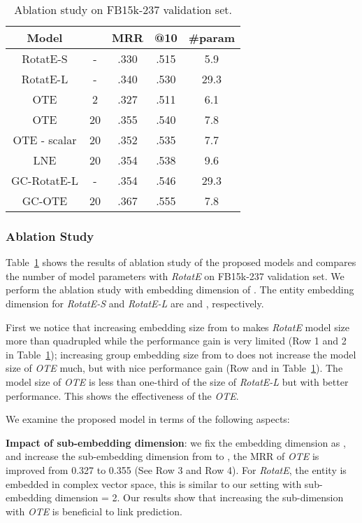 \documentclass[11pt,a4paper]{article}
\begin{document}
\begin{table}[!h]
    \small
    \centering
    \begin{tabular}{c|c|c|c|c}
        \hline
        Model &  & MRR & @10 & \#param\\
         \hline
         RotatE-S & - & .330 & .515 & 5.9 \\
         \hline
         RotatE-L & - & .340 & .530 & 29.3 \\
         \hline
         \hline
         OTE & 2 & .327 & .511 & 6.1 \\
         \hline
         OTE & 20 & .355 & .540 & 7.8 \\
         \hline
         \hline
         OTE - scalar & 20 & .352 & .535 & 7.7 \\
         \hline
         LNE & 20 & .354 & .538 & 9.6 \\
\hline
         \hline
         GC-RotatE-L & - & .354  & .546 & 29.3 \\
         \hline
         GC-OTE & 20 & .367 & .555 & 7.8 \\
         \hline
    \end{tabular}
 \caption{Ablation study on FB15k-237 validation set.} 
    \label{tab:ablation}
\end{table}

\subsubsection{Ablation Study}
Table~\ref{tab:ablation} shows the results of ablation study of the proposed models and compares the number of model parameters with \textit{RotatE} on FB15k-237 validation set. We perform the ablation study with embedding dimension of . The entity embedding dimension for {\it RotatE-S} and {\it RotatE-L} are  and , respectively.

First we notice that increasing embedding size from  to  makes {\it RotatE} model size more than quadrupled while the performance gain is very limited (Row 1 and 2 in Table~\ref{tab:ablation}); increasing group embedding size from  to  does not increase the model size of {\it OTE} much, but with nice performance gain (Row  and  in Table~\ref{tab:ablation}). The model size of {\it OTE} is less than one-third of the size of {\it RotatE-L} but with better performance. This shows the effectiveness of the {\it OTE}.

We examine the proposed model in terms of the following aspects:

\noindent\textbf{Impact of sub-embedding dimension}: we fix the embedding dimension as , and increase the sub-embedding dimension  from  to , the MRR of \textit{OTE} is improved from 0.327 to 0.355 (See Row 3 and Row 4).  For \textit{RotatE}, the entity is embedded in complex vector space, this is similar to our setting with sub-embedding dimension = 2. Our results show that increasing the sub-dimension with {\it OTE} is beneficial to link prediction. 
\end{document}
